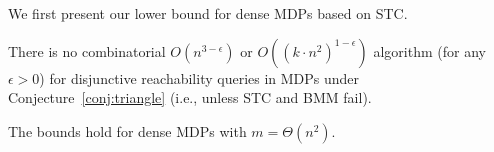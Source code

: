 \documentclass[11pt,letterpaper]{article}
\newcommand{\lu}{\textup{(}}
\newcommand{\ru}{\textup{)}\xspace}
\newcommand{\upbr}[1]{\lu #1\ru}
\newif\iffullversion
\newcommand{\infull}[1]{\iffullversion #1\fi}
\begin{document}
\infull{
Here we complement the above algorithm by conditional lower bounds for disjunctive reachability queries in MDPs.
These lower bound will be based on the conjectures STC, SETH, and OVC 
introduced in Section~\ref{sec:conjectures}.
}

We first present our lower bound for dense MDPs based on STC.
\begin{theorem}\label{thm:reach_STChard}
  There is no combinatorial $O(n^{3-\epsilon})$ or $O((k\cdot n^2)^{1-\epsilon})$ algorithm \upbr{for any $\epsilon > 0$} for disjunctive reachability queries in MDPs under Conjecture~\ref{conj:triangle} \upbr{i.e., unless STC and BMM fail}. 
  \infull{In particular, there is no such algorithm deciding whether the winning set is non-empty
  or deciding whether a specific vertex is in the winning set.}
  The bounds hold for dense MDPs with $m = \Theta(n^2)$.
\end{theorem}
\end{document}
